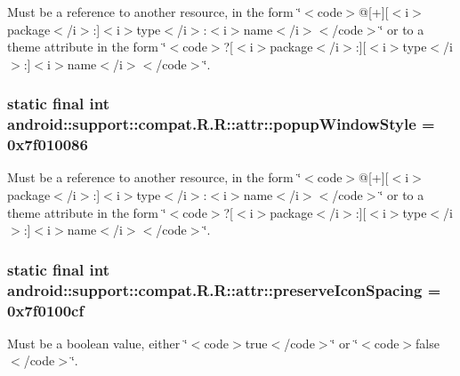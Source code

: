 Must be a reference to another resource, in the form \char`\"{}$<$code$>$@\mbox{[}+\mbox{]}\mbox{[}$<$i$>$package$<$/i$>$:\mbox{]}$<$i$>$type$<$/i$>$:$<$i$>$name$<$/i$>$$<$/code$>$\char`\"{} or to a theme attribute in the form \char`\"{}$<$code$>$?\mbox{[}$<$i$>$package$<$/i$>$:\mbox{]}\mbox{[}$<$i$>$type$<$/i$>$:\mbox{]}$<$i$>$name$<$/i$>$$<$/code$>$\char`\"{}. \hypertarget{classandroid_1_1support_1_1compat_1_1_r_1_1attr_1b1f0cde361a860b964ab7d0312a165e}{
\subsubsection[{popupWindowStyle}]{\setlength{\rightskip}{0pt plus 5cm}static final int android::support::compat.R.R::attr::popupWindowStyle = 0x7f010086}}
\label{classandroid_1_1support_1_1compat_1_1_r_1_1attr_1b1f0cde361a860b964ab7d0312a165e}


Must be a reference to another resource, in the form \char`\"{}$<$code$>$@\mbox{[}+\mbox{]}\mbox{[}$<$i$>$package$<$/i$>$:\mbox{]}$<$i$>$type$<$/i$>$:$<$i$>$name$<$/i$>$$<$/code$>$\char`\"{} or to a theme attribute in the form \char`\"{}$<$code$>$?\mbox{[}$<$i$>$package$<$/i$>$:\mbox{]}\mbox{[}$<$i$>$type$<$/i$>$:\mbox{]}$<$i$>$name$<$/i$>$$<$/code$>$\char`\"{}. \hypertarget{classandroid_1_1support_1_1compat_1_1_r_1_1attr_b85def28fd153df0aaa3ce39ce579cbf}{
\subsubsection[{preserveIconSpacing}]{\setlength{\rightskip}{0pt plus 5cm}static final int android::support::compat.R.R::attr::preserveIconSpacing = 0x7f0100cf}}
\label{classandroid_1_1support_1_1compat_1_1_r_1_1attr_b85def28fd153df0aaa3ce39ce579cbf}


Must be a boolean value, either \char`\"{}$<$code$>$true$<$/code$>$\char`\"{} or \char`\"{}$<$code$>$false$<$/code$>$\char`\"{}. 

